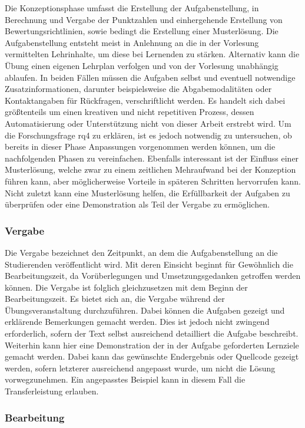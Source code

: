 Die Konzeptionsphase umfasst die Erstellung der Aufgabenstellung, in Berechnung und Vergabe der Punktzahlen und einhergehende Erstellung von Bewertungsrichtlinien, sowie bedingt die Erstellung einer Musterlösung.
Die Aufgabenstellung entsteht meist in Anlehnung an die in der Vorlesung vermittelten Lehrinhalte, um diese bei Lernenden zu stärken.
Alternativ kann die Übung einen eigenen Lehrplan verfolgen und von der Vorlesung unabhängig ablaufen.
In beiden Fällen müssen die Aufgaben selbst und eventuell notwendige Zusatzinformationen, darunter beispielsweise die Abgabemodalitäten oder Kontaktangaben für Rückfragen, verschriftlicht werden.
Es handelt sich dabei größtenteils um einen kreativen und nicht repetitiven Prozess, dessen Automatisierung oder Unterstützung nicht von dieser Arbeit erstrebt wird.
Um die Forschungsfrage \acs{rq}4 zu erklären, ist es jedoch notwendig zu untersuchen, ob bereits in dieser Phase Anpassungen vorgenommen werden können, um die nachfolgenden Phasen zu vereinfachen.
Ebenfalls interessant ist der Einfluss einer Musterlösung, welche zwar zu einem zeitlichen Mehraufwand bei der Konzeption führen kann, aber möglicherweise Vorteile in späteren Schritten hervorrufen kann.
Nicht zuletzt kann eine Musterlösung helfen, die Erfüllbarkeit der Aufgaben zu überprüfen oder eine Demonstration als Teil der Vergabe zu ermöglichen.

\subsubsection{Vergabe}

Die Vergabe bezeichnet den Zeitpunkt, an dem die Aufgabenstellung an die Studierenden veröffentlicht wird.
Mit deren Einsicht beginnt für Gewöhnlich die Bearbeitungszeit, da Vorüberlegungen und Umsetzungsgedanken getroffen werden können.
Die Vergabe ist folglich gleichzusetzen mit dem Beginn der Bearbeitungszeit.
Es bietet sich an, die Vergabe während der Übungsveranstaltung durchzuführen.
Dabei können die Aufgaben gezeigt und erklärende Bemerkungen gemacht werden.
Dies ist jedoch nicht zwingend erforderlich, sofern der Text selbst ausreichend detailliert die Aufgabe beschreibt.
Weiterhin kann hier eine Demonstration der in der Aufgabe geforderten Lernziele gemacht werden.
Dabei kann das gewünschte Endergebnis oder Quellcode gezeigt werden, sofern letzterer ausreichend angepasst wurde, um nicht die Lösung vorwegzunehmen.
Ein angepasstes Beispiel kann in diesem Fall die Transferleistung erlauben.

\subsubsection{Bearbeitung}

